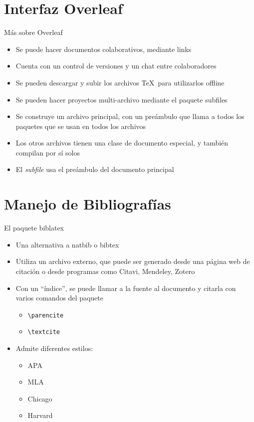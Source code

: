 \documentclass{beamer}
\begin{document}
\section{Interfaz Overleaf}
\begin{frame}{Más sobre Overleaf}
\begin{itemize}
    \item Se puede hacer documentos colaborativos, mediante links
    \item Cuenta con un control de versiones y un chat entre colaboradores
    \item Se pueden descargar y subir los archivos \TeX\ para utilizarlos offline
     \item Se pueden hacer proyectos multi-archivo mediante el paquete \textsf{subfiles}
    \item Se construye un archivo principal, con un preámbulo que llama a todos los paquetes que se usan en todos los archivos
    \item Los otros archivos tienen una clase de documento especial, y también compilan por sí solos
    \item El \textit{subfile} usa el preámbulo del documento principal
\end{itemize}
\end{frame}
\section{Manejo de Bibliografías}
\begin{frame}{El paquete \textsf{biblatex}}
    \begin{itemize}
        \item Una alternativa a \textsf{natbib} o \textsf{bibtex}
        \item Utiliza un archivo externo, que puede ser generado desde una página web de citación o desde programas como Citavi, Mendeley, Zotero
        \item Con un ``índice'', se puede llamar a la fuente al documento y citarla con varios comandos del paquete 
        \begin{itemize}
            \item \texttt{\textbackslash parencite}
            \item \texttt{\textbackslash textcite}
        \end{itemize}
        \item Admite diferentes estilos:
        \begin{itemize}
            \item APA
            \item MLA
            \item Chicago
            \item Harvard
        \end{itemize}
    \end{itemize}
\end{frame}
\end{document}
